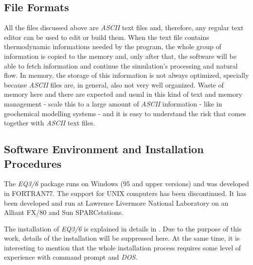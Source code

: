 \subsection{File Formats}
All the files discussed above are \emph{ASCII} text files and, therefore, any regular text editor can be used to edit or build them. When the text file contains thermodynamic informations needed by the program, the whole group of information is copied to the memory and, only after that, the software will be able to fetch information and continue the simulation's processing and natural flow. In memory, the storage of this information is not always optimized, specially because \emph{ASCII} files are, in general, also not very well organized. Waste of memory here and there are expected and usual in this kind of text and memory management - scale this to a large amount of \emph{ASCII} information - like in geochemical modelling systems - and it is easy to understand the risk that comes together with \emph{ASCII} text files. 

\subsection{Software Environment and Installation Procedures}
The \emph{EQ3/6} package runs on Windows (95 and upper versions) and was developed in FORTRAN77. The support for UNIX computers has been discontinued.  It has been developed and run at Lawrence Livermore National Laboratory on an Alliant FX/80 and Sun SPARCstations.

The installation of \emph{EQ3/6} is explained in details in \cite{Wolery:92}. Due to the purpose of this work, details of the installation will be suppressed here. At the same time, it is interesting to mention that the whole installation process requires some level of experience with command prompt and \emph{DOS}.



